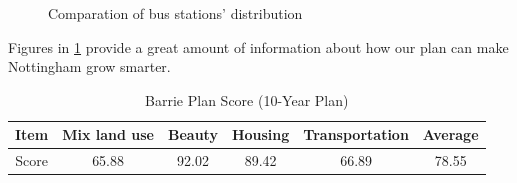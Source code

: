 \begin{figure}[htb]
  \label{fig:barrie-bus-comp}
  \centering
  \caption{Comparation of bus stations' distribution}
\end{figure}
Figures in \ref{fig:barrie-bus-comp} provide a great amount of information about how our plan can make Nottingham grow smarter.\\
\begin{table}[t]
\centering
  \begin{tabular}{c|cccc|c}
    \hline
    Item & Mix land use & Beauty & Housing & Transportation & Average \\
    \hline
    Score & 65.88 & 92.02 & 89.42 & 66.89 & 78.55 \\
    \hline
  \end{tabular}
  \caption{Barrie Plan Score (10-Year Plan)}
  \label{tab:barrie-model-score}
\end{table}

